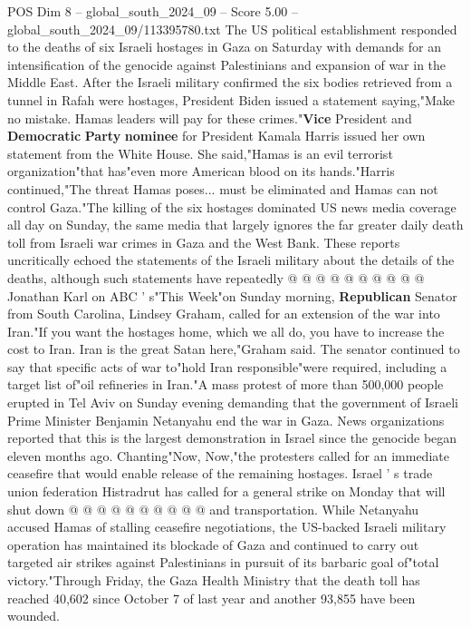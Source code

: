 \begin{textsample}{POS Dim 8 – global\_south\_2024\_09 – Score 5.00 – global\_south\_2024\_09/113395780.txt}  \label{ex:f8_pos_258}
The US political establishment responded to the deaths of six Israeli hostages in Gaza on Saturday with demands for an intensification of the genocide against Palestinians and expansion of war in the Middle East.
After the Israeli military confirmed the six bodies retrieved from a tunnel in Rafah were hostages, President Biden issued a statement saying,"Make no mistake.
Hamas leaders will pay for these crimes."\textbf{Vice} President and \textbf{Democratic} \textbf{Party} \textbf{nominee} for President Kamala Harris issued her own statement from the White House.
She said,"Hamas is an evil terrorist organization"that has"even more American blood on its hands."Harris continued,"The threat Hamas poses... must be eliminated and Hamas can not control Gaza."The killing of the six hostages dominated US news media coverage all day on Sunday, the same media that largely ignores the far greater daily death toll from Israeli war crimes in Gaza and the West Bank.
These reports uncritically echoed the statements of the Israeli military about the details of the deaths, although such statements have repeatedly @ @ @ @ @ @ @ @ @ @ Jonathan Karl on ABC ' s"This Week"on Sunday morning, \textbf{Republican} Senator from South Carolina, Lindsey Graham, called for an extension of the war into Iran."If you want the hostages home, which we all do, you have to increase the cost to Iran.
Iran is the great Satan here,"Graham said.
The senator continued to say that specific acts of war to"hold Iran responsible"were required, including a target list of"oil refineries in Iran."A mass protest of more than 500,000 people erupted in Tel Aviv on Sunday evening demanding that the government of Israeli Prime Minister Benjamin Netanyahu end the war in Gaza.
News organizations reported that this is the largest demonstration in Israel since the genocide began eleven months ago.
Chanting"Now, Now,"the protesters called for an immediate ceasefire that would enable release of the remaining hostages.
Israel ' s trade union federation Histradrut has called for a general strike on Monday that will shut down @ @ @ @ @ @ @ @ @ @ and transportation.
While Netanyahu accused Hamas of stalling ceasefire negotiations, the US-backed Israeli military operation has maintained its blockade of Gaza and continued to carry out targeted air strikes against Palestinians in pursuit of its barbaric goal of"total victory."Through Friday, the Gaza Health Ministry that the death toll has reached 40,602 since October 7 of last year and another 93,855 have been wounded.

\end{textsample}
